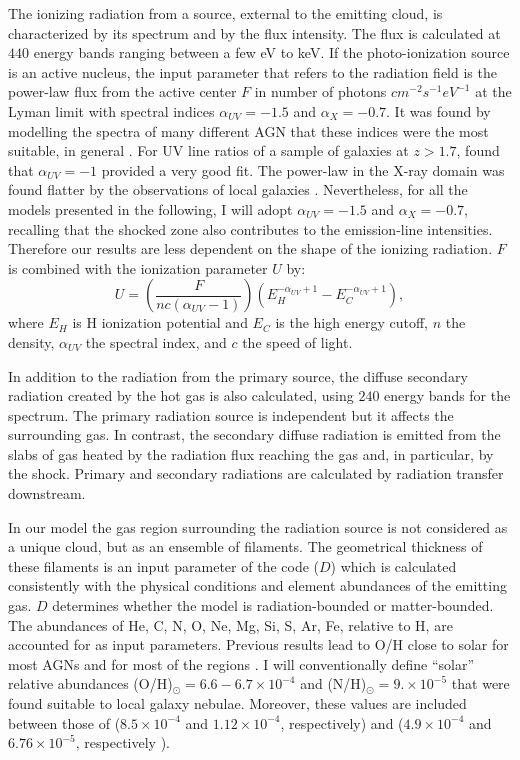 \documentclass[../main.tex]{subfiles}
\begin{document}
The ionizing radiation from a source, external to the emitting cloud, is characterized by its spectrum and by the flux intensity. 
The flux is calculated at $440$ energy bands ranging between a few eV to keV.
If the photo-ionization source is an active nucleus, the input parameter that refers to the radiation field is the power-law flux  from the active center $F$ in number of photons $\si{cm^{-2} s^{-1} eV^{-1}}$ at the Lyman limit with spectral indices  $\alpha_{UV}=-1.5$ and $\alpha_X=-0.7$.
It was found by modelling the spectra of many different AGN that these indices were the most suitable, in general \citep[see, e.g.][ and references therein]{Contini83,Aldrovandi84,Rodriguez05}.
For UV line ratios of a sample of galaxies at $z> 1.7$, \citet{Villar97} found that $\alpha_{UV}=-1$ provided a very good fit.
The power-law in the X-ray domain was found flatter by the observations of local galaxies \citep[$\alpha_X=-1$, e.g.][]{Crenshaw02,Turner01}.
Nevertheless, for all the models presented in the following, I will adopt $\alpha_{UV}=-1.5$ and $\alpha_{X} = -0.7$, recalling that the shocked zone also contributes to the emission-line intensities.  
Therefore our results are less dependent on the shape of the ionizing radiation.
$F$ is combined with the ionization parameter $U$ by: 
\begin{equation}
\label{eq:Umarc}
U= \left(\frac{F}{n c (\alpha_{UV} -1)}\right) \left(E_H^{-\alpha_{UV} +1} - E_C^{-\alpha_{UV} +1}\right),
\end{equation}
where $E_H$ is H ionization potential  and $E_C$ is the high energy cutoff, $n$ the density, $\alpha_{UV}$ the spectral index, and $c$ the speed of light.

In addition to the radiation from the primary source, the diffuse secondary radiation created by the hot gas is also calculated, using $240$ energy bands for the spectrum.
The primary radiation source is independent but it affects the surrounding gas.
In contrast, the secondary diffuse radiation is emitted from the slabs of gas heated by the radiation flux reaching the gas and, in particular, by the shock.
Primary and secondary radiations are calculated by radiation transfer downstream.

In our model the gas region surrounding the radiation source is not considered as a unique cloud, but as an ensemble of filaments. 
The geometrical thickness of these filaments is an input parameter of the code ($D$) which is calculated consistently with the physical conditions and element abundances of the emitting gas.
$D$ determines whether the model is radiation-bounded or matter-bounded.
The abundances of He, C, N, O, Ne, Mg, Si, S, Ar, Fe, relative to H, are accounted for as input parameters. 
Previous results lead to O/H close to solar for most AGNs and for most of the  regions \citep[e.g.][]{Contini17}.
I will conventionally define ``solar''  relative abundances (O/H)$_{\odot }=6.6 - 6.7 \times10^{-4}$ and (N/H)$_{\odot }= 9.\times10^{-5}$ \citep{Allen76,Grevesse98} that were found suitable to local galaxy nebulae. 
Moreover, these values are included between those of \citet{Anders89} ($8.5\times10^{-4}$ and $1.12\times10^{-4}$, respectively) and \citet{Asplund09} ($4.9\times10^{-4}$ and $6.76\times10^{-5}$, respectively ).
\end{document}
